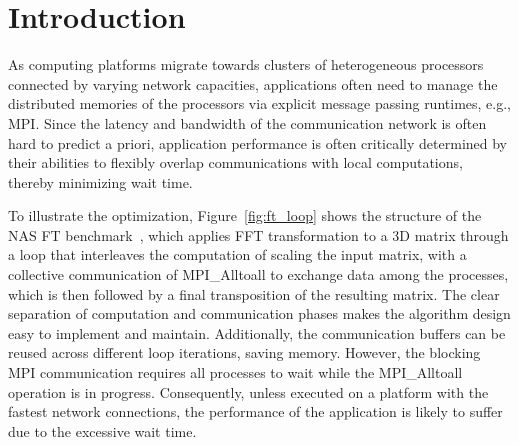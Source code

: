 \section{Introduction}
\label{sec:intro}


%
As computing platforms migrate towards clusters of heterogeneous processors connected by varying
network capacities, applications often need to manage the distributed memories of the processors
via explicit message passing runtimes, e.g., MPI.
Since the latency and bandwidth of the communication network is often hard to predict a priori, application performance is
often critically determined by their abilities to flexibly overlap communications with local computations, thereby minimizing
wait time.

To illustrate the optimization, Figure~\ref{fig:ft_loop} shows the structure of the NAS FT benchmark~\cite{npb},
  which applies FFT transformation to a 3D matrix through a loop that interleaves the computation of scaling  the input matrix,
with a collective communication of MPI\_Alltoall to exchange data among the processes, which is then followed by a final transposition
of the resulting matrix.
The clear separation of computation and communication phases makes the algorithm design easy to implement and maintain.
Additionally, the communication buffers can be reused across different loop iterations, saving memory.
However, the blocking MPI communication requires all processes to wait while the MPI\_Alltoall operation is in progress.
Consequently, unless executed on a platform with the fastest network connections, the performance of the application is likely to suffer
due to the excessive wait time.

